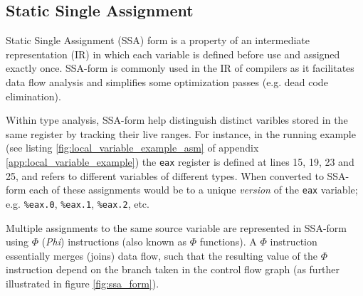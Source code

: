 
\subsection{Static Single Assignment}

Static Single Assignment (SSA) form is a property of an intermediate representation (IR) in which each variable is defined before use and assigned exactly once. SSA-form is commonly used in the IR of compilers as it facilitates data flow analysis and simplifies some optimization passes (e.g. dead code elimination).


Within type analysis, SSA-form help distinguish distinct varibles stored in the same register by tracking their live ranges. For instance, in the running example (see listing \ref{fig:local_variable_example_asm} of appendix \ref{app:local_variable_example}) the \texttt{eax} register is defined at lines 15, 19, 23 and 25, and refers to different variables of different types. When converted to SSA-form each of these assignments would be to a unique \textit{version} of the \texttt{eax} variable; e.g. \texttt{\%eax.0}, \texttt{\%eax.1}, \texttt{\%eax.2}, etc.

Multiple assignments to the same source variable are represented in SSA-form using $\Phi$ (\textit{Phi}) instructions (also known as $\Phi$ functions). A $\Phi$ instruction essentially merges (joins) data flow, such that the resulting value of the $\Phi$ instruction depend on the branch taken in the control flow graph (as further illustrated in figure \ref{fig:ssa_form}).


